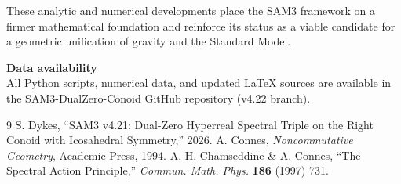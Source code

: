 \documentclass[11pt,a4paper]{article}
\begin{document}
These analytic and numerical developments place the SAM3 framework on a firmer mathematical foundation and reinforce its status as a viable candidate for a geometric unification of gravity and the Standard Model.

\vspace{1em}
\noindent\textbf{Data availability}\\
All Python scripts, numerical data, and updated LaTeX sources are available in the SAM3-DualZero-Conoid GitHub repository (v4.22 branch).

\begin{thebibliography}{9}
 S. Dykes, ``SAM3 v4.21: Dual-Zero Hyperreal Spectral Triple on the Right Conoid with Icosahedral Symmetry,'' 2026.
 A. Connes, \textit{Noncommutative Geometry}, Academic Press, 1994.
 A. H. Chamseddine \& A. Connes, ``The Spectral Action Principle,'' \textit{Commun. Math. Phys.} \textbf{186} (1997) 731.
\end{thebibliography}
\end{document}
